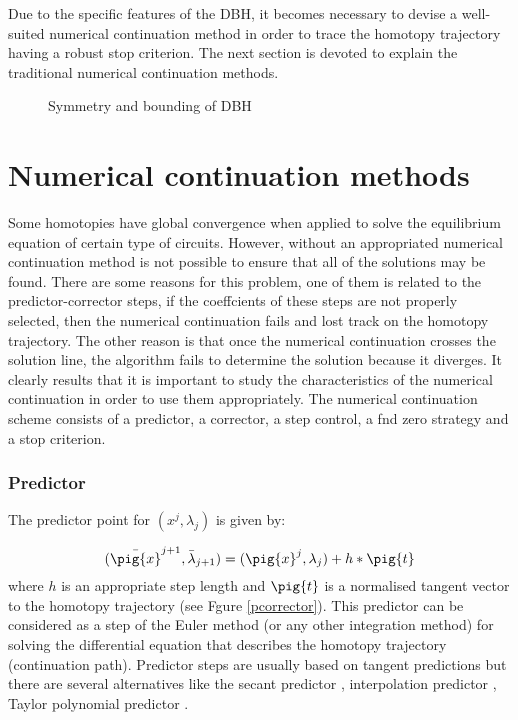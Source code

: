 \documentclass[conference]{IEEEtran}
\begin{document}
Due to the specific features of the DBH, it becomes 
necessary to devise a well-suited numerical continuation method
in order to trace the homotopy trajectory having  a robust stop criterion.
The next section is devoted to explain the traditional
numerical continuation methods.

\begin{figure}[hbtp]
\centerline{
\epsfxsize=62mm
}
\caption{Symmetry and bounding of DBH}
\label{halftrack}
\end{figure}


\section{Numerical continuation methods}

Some homotopies have global convergence when applied to solve
the equilibrium equation of certain type of circuits. 
However, without an appropriated numerical continuation
method is not possible to ensure that all of the solutions
may be found.  There are some reasons for
this problem, one of them is related to the
predictor-corrector steps, if the coeffcients 
of these steps are not properly selected,
then the numerical continuation fails and lost track on
the homotopy trajectory. The other reason is that once the numerical continuation crosses the solution line,
the algorithm fails to determine the solution because it diverges. It clearly results that it is important to study the characteristics
of the numerical continuation in order to use them appropriately.
The numerical continuation scheme consists of a predictor, a corrector, a step control, a fnd zero strategy and
a stop criterion.



\subsubsection{Predictor}

The predictor point for $(x^j,\lambda_j)$ is given by:

\begin{displaymath}
(\bar{\pig{x}}^{j+1},\bar{\lambda}_{j+1})=(\pig{x}^j,\lambda_j)+h*\pig{t}
\end{displaymath}
where $h$ is an appropriate step length and $\pig{t}$ is a normalised
tangent vector to the
homotopy trajectory (see Fgure \ref{pcorrector}).
This predictor can be considered as a step of the Euler
method  (or any other integration method)
for solving the differential equation that describes
the homotopy trajectory (continuation path). 
Predictor steps are usually based on tangent predictions but there are
several alternatives like
 the secant predictor \cite{homo_seydel}, interpolation predictor
\cite{homo_allgower}, Taylor polynomial predictor \cite{homo_allgower}. 
\end{document}
